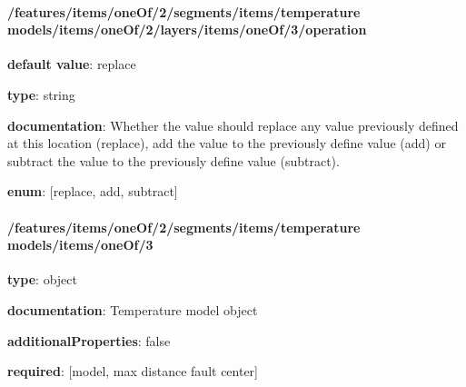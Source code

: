 \begin{itemized}
\end{itemized}\paragraph{/features/items/oneOf/2/segments/items/temperature models/items/oneOf/2/layers/items/oneOf/3/operation} \begin{itemized}
\item {\bf default value}: replace
\item {\bf type}: string
\item {\bf documentation}: Whether the value should replace any value previously defined at this location (replace), add the value to the previously define value (add) or subtract the value to the previously define value (subtract).
\item {\bf enum}: [replace, add, subtract]\end{itemized}\paragraph{/features/items/oneOf/2/segments/items/temperature models/items/oneOf/3} \begin{itemized}
\item {\bf type}: object
\item {\bf documentation}: Temperature model object
\item {\bf additionalProperties}: false
\item {\bf required}: [model, max distance fault center]\end{itemized}
